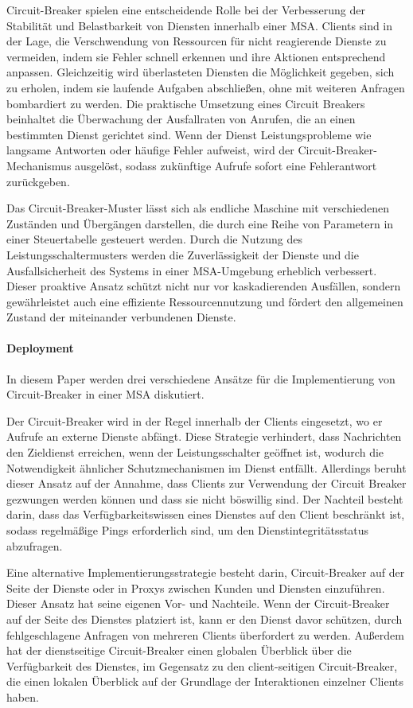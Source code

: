 Circuit-Breaker spielen eine entscheidende Rolle bei der Verbesserung der Stabilität und
Belastbarkeit von Diensten innerhalb einer MSA\@.
Clients sind in der Lage, die Verschwendung von Ressourcen für nicht reagierende Dienste zu vermeiden,
indem sie Fehler schnell erkennen und ihre Aktionen entsprechend anpassen.
Gleichzeitig wird überlasteten Diensten die Möglichkeit gegeben, sich zu erholen,
indem sie laufende Aufgaben abschließen, ohne mit weiteren Anfragen bombardiert zu werden.
Die praktische Umsetzung eines Circuit Breakers beinhaltet die Überwachung der Ausfallraten von Anrufen,
die an einen bestimmten Dienst gerichtet sind.
Wenn der Dienst Leistungsprobleme wie langsame Antworten oder häufige Fehler aufweist,
wird der Circuit-Breaker-Mechanismus ausgelöst,
sodass zukünftige Aufrufe sofort eine Fehlerantwort zurückgeben.

Das Circuit-Breaker-Muster lässt sich als endliche Maschine mit verschiedenen Zuständen
und Übergängen darstellen, die durch eine Reihe von Parametern in einer Steuertabelle gesteuert werden.
Durch die Nutzung des Leistungsschaltermusters werden die Zuverlässigkeit der Dienste und die
Ausfallsicherheit des Systems in einer MSA-Umgebung erheblich verbessert.
Dieser proaktive Ansatz schützt nicht nur vor kaskadierenden Ausfällen,
sondern gewährleistet auch eine effiziente Ressourcennutzung und fördert den allgemeinen Zustand
der miteinander verbundenen Dienste.


\paragraph{Deployment}

In diesem Paper werden drei verschiedene Ansätze für die Implementierung von Circuit-Breaker
in einer MSA diskutiert.

Der Circuit-Breaker wird in der Regel innerhalb der Clients eingesetzt,
wo er Aufrufe an externe Dienste abfängt.
Diese Strategie verhindert, dass Nachrichten den Zieldienst erreichen, wenn der
Leistungsschalter geöffnet ist, wodurch die Notwendigkeit ähnlicher
Schutzmechanismen im Dienst entfällt.
Allerdings beruht dieser Ansatz auf der Annahme, dass Clients zur Verwendung der Circuit Breaker
gezwungen werden können und dass sie nicht böswillig sind.
Der Nachteil besteht darin, dass das Verfügbarkeitswissen eines Dienstes auf den Client beschränkt ist,
sodass regelmäßige Pings erforderlich sind, um den Dienstintegritätsstatus abzufragen.

Eine alternative Implementierungsstrategie besteht darin,
Circuit-Breaker auf der Seite der Dienste oder in Proxys zwischen Kunden und Diensten einzuführen.
Dieser Ansatz hat seine eigenen Vor- und Nachteile.
Wenn der Circuit-Breaker auf der Seite des Dienstes platziert ist,
kann er den Dienst davor schützen, durch fehlgeschlagene Anfragen von mehreren Clients überfordert zu werden.
Außerdem hat der dienstseitige Circuit-Breaker einen globalen Überblick über die Verfügbarkeit des Dienstes,
im Gegensatz zu den client-seitigen Circuit-Breaker, die einen lokalen Überblick
auf der Grundlage der Interaktionen einzelner Clients haben.

